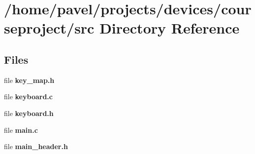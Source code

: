 \section{/home/pavel/projects/devices/courseproject/src Directory Reference}
\label{dir_68267d1309a1af8e8297ef4c3efbcdba}
\subsection*{Files}
\begin{DoxyCompactItemize}
\item 
file {\bfseries key\-\_\-map.\-h}
\item 
file {\bfseries keyboard.\-c}
\item 
file {\bfseries keyboard.\-h}
\item 
file {\bfseries main.\-c}
\item 
file {\bfseries main\-\_\-header.\-h}
\end{DoxyCompactItemize}
